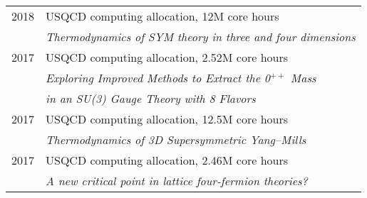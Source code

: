 \documentclass[10 pt]{article}
\begin{document}
\begin{tabular}[t]{cl}
  2018 & USQCD computing allocation, 12M core hours                                                                                                                                                                                \\ %
       & \textit{Thermodynamics of SYM theory in three and four dimensions}                                                                                                                                                        \\[6 pt]
  2017 & USQCD computing allocation, 2.52M core hours                                                                                                                                                                              \\ %
       & \textit{Exploring Improved Methods to Extract the 0$^{++}$ Mass} \\ & \textit{in an SU(3) Gauge Theory with 8 Flavors}                                                                                                    \\[6 pt]
  2017 & USQCD computing allocation, 12.5M core hours                                                                                                                                                                              \\ %
       & \textit{Thermodynamics of 3D Supersymmetric Yang--Mills}                                                                                                                                                                  \\[6 pt]
  2017 & USQCD computing allocation, 2.46M core hours                                                                                                                                                                              \\ %
       & \textit{A new critical point in lattice four-fermion theories?}                                                                                                                                                                                                                                                              \\
\end{tabular}
\end{document}
